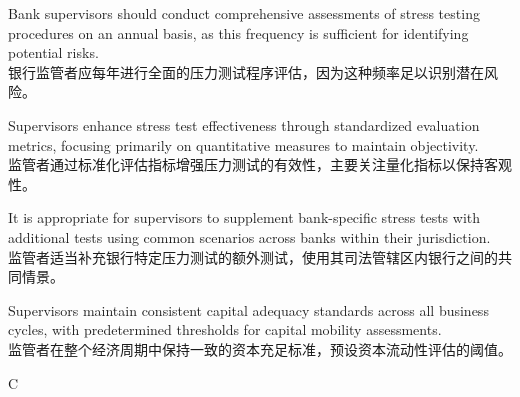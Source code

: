 \documentclass{article}
\begin{document}
\begin{choices}
    \item Bank supervisors should conduct comprehensive assessments of stress testing procedures on an annual basis, as this frequency is sufficient for identifying potential risks.\\
    银行监管者应每年进行全面的压力测试程序评估，因为这种频率足以识别潜在风险。
    
    \item Supervisors enhance stress test effectiveness through standardized evaluation metrics, focusing primarily on quantitative measures to maintain objectivity.\\
    监管者通过标准化评估指标增强压力测试的有效性，主要关注量化指标以保持客观性。
    
    \item It is appropriate for supervisors to supplement bank-specific stress tests with additional tests using common scenarios across banks within their jurisdiction.\\
    监管者适当补充银行特定压力测试的额外测试，使用其司法管辖区内银行之间的共同情景。
    
    \item Supervisors maintain consistent capital adequacy standards across all business cycles, with predetermined thresholds for capital mobility assessments.\\
    监管者在整个经济周期中保持一致的资本充足标准，预设资本流动性评估的阈值。
\end{choices}

\begin{correctanswer}
    C
\end{correctanswer}
\end{document}
